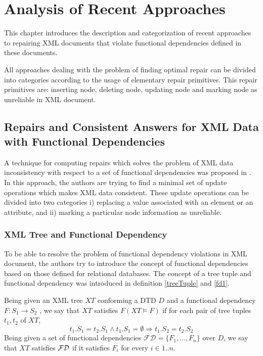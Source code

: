 \chapter{Analysis of Recent Approaches}

This chapter introduces the description and categorization of recent approaches to repairing XML documents that violate functional dependencies defined in these documents.

All approaches dealing with the problem of finding optimal repair can be divided into categories according to the usage of elementary repair primitives. This repair primitives are: inserting node, deleting node, updating node and marking node as unreliable in XML document.

\section[Repairs and Consistent Answers for XML Data]{Repairs and Consistent Answers for XML Data with Functional Dependencies}\label{RepConstAnswers}

A technique for computing repairs which solves the problem of XML data inconsistency with respect to a set of functional dependencies was proposed in \cite{RepAndConsistentAnswer}. In this approach, the authors are trying to find a minimal set of update operations which makes XML data consistent. These update operations can be divided into two categories i) replacing a value associated with an element or an attribute, and ii) marking a particular node information as unreliable.

\subsection{XML Tree and Functional Dependency}

To be able to resolve the problem of functional dependency violations in XML document, the authors try to introduce the concept of functional dependencies based on those defined for relational databases. The concept of a tree tuple and functional dependency was introduced in definition \ref{treeTuple} and \ref{fd1}.

Being given an XML tree $XT$ conforming a DTD $D$ and a functional dependency $F : S_1 \rightarrow S_2$ , we say that $XT$ satisfies $F (XT \models F )$ if for each pair of tree tuples $t_1, t_2$ of $XT$, $$t_1.S_1 = t_2.S_1 \land t_1.S_1 = \emptyset \Rightarrow t_1.S_2 = t_2.S_2$$
Being given a set of functional dependencies $\mathcal{FD} = \{F_1 , \dots, F_n\}$ over $D$, we say that $XT$ satisfies $\cal FD$ if it satisfies $F_i$ for every $i \in 1..n$.


